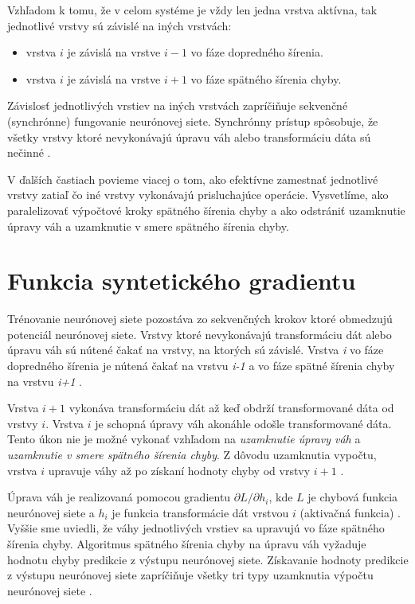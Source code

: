 Vzhľadom k tomu, že v celom systéme je vždy len jedna vrstva aktívna, tak jednotlivé vrstvy sú závislé na iných vrstvách:
\begin{itemize}
    \item vrstva $i$ je závislá na vrstve $i-1$ vo fáze dopredného šírenia.
    \item vrstva $i$ je závislá na vrstve $i+1$ vo fáze spätného šírenia chyby.
\end{itemize}
Závislosť jednotlivých vrstiev na iných vrstvách zapríčiňuje sekvenčné (synchrónne) fungovanie neurónovej siete. Synchrónny prístup spôsobuje, že všetky vrstvy ktoré nevykonávajú úpravu váh alebo transformáciu dáta sú nečinné \cite{Jaderberg2016}.

V ďalších častiach povieme viacej o tom, ako efektívne zamestnať jednotlivé vrstvy zatiaľ čo iné vrstvy vykonávajú prisluchajúce operácie. Vysvetlíme, ako paralelizovať výpočtové kroky spätného šírenia chyby a ako odstrániť uzamknutie úpravy váh a uzamknutie v smere spätného šírenia chyby.

\section{Funkcia syntetického gradientu}
\label{understanding_SG} %
Trénovanie neurónovej siete pozostáva zo sekvenčných krokov ktoré obmedzujú potenciál neurónovej siete. Vrstvy ktoré nevykonávajú transformáciu dát alebo úpravu váh sú nútené čakať na vrstvy, na ktorých sú závislé. Vrstva \textit{i} vo fáze dopredného šírenia je nútená čakať na vrstvu \textit{i-1} a vo fáze spätné šírenia chyby na vrstvu \textit{i+1} \cite{Jaderberg2016}. 

Vrstva $i+1$ vykonáva transformáciu dát až keď obdrží transformované dáta od vrstvy $i$. Vrstva $i$ je schopná úpravy váh akonáhle odošle transformované dáta. Tento úkon nie je možné vykonať vzhľadom na \textit{uzamknutie úpravy váh} a \textit{uzamknutie v smere spätného šírenia chyby}. Z dôvodu uzamknutia vypočtu, vrstva $i$ upravuje váhy až po získaní hodnoty chyby od vrstvy $i+1$ \cite{Jaderberg2016}.


Úprava váh je realizovaná pomocou gradientu $\partial L/\partial h_i$, kde $L$ je chybová funkcia neurónovej siete a $h_i$ je funkcia transformácie dát vrstvou $i$ (aktivačná funkcia) \cite{Goh1995}. Vyššie sme uviedli, že váhy jednotlivých vrstiev sa upravujú vo fáze spätného šírenia chyby. Algoritmus spätného šírenia chyby na úpravu váh vyžaduje hodnotu chyby predikcie z výstupu neurónovej siete. Získavanie hodnoty predikcie z výstupu neurónovej siete zapríčiňuje všetky tri typy uzamknutia výpočtu neurónovej siete \cite{Goh1995, Czarnecki2017, Jaderberg2016}.

